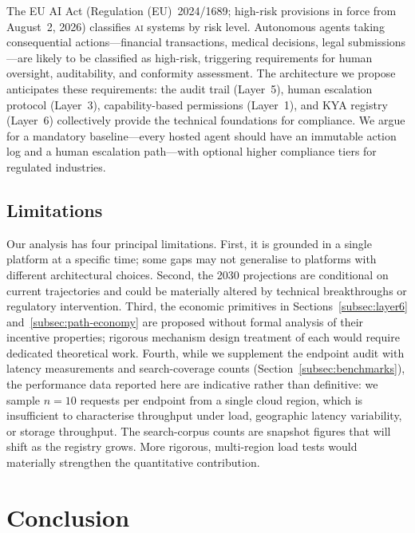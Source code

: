 \documentclass[twoside,11pt]{article}
\begin{document}
The EU AI Act (Regulation (EU)~2024/1689; high-risk provisions in force from
August~2, 2026) classifies
\textsc{ai} systems by risk level.  Autonomous agents taking consequential
actions---financial transactions, medical decisions, legal submissions---are
likely to be classified as high-risk, triggering requirements for human
oversight, auditability, and conformity assessment.  The architecture we
propose anticipates these requirements: the audit trail (Layer~5), human
escalation protocol (Layer~3), capability-based permissions (Layer~1), and
KYA registry (Layer~6) collectively provide the technical foundations for
compliance.  We argue for a mandatory baseline---every hosted agent should have
an immutable action log and a human escalation path---with optional higher
compliance tiers for regulated industries.

\subsection{Limitations}
\label{subsec:limitations}

Our analysis has four principal limitations.  First, it is grounded in a
single platform at a specific time; some gaps may not generalise to platforms
with different architectural choices.  Second, the 2030 projections are
conditional on current trajectories and could be materially altered by
technical breakthroughs or regulatory intervention.  Third, the economic
primitives in Sections~\ref{subsec:layer6} and~\ref{subsec:path-economy} are
proposed without formal analysis of their incentive properties; rigorous
mechanism design treatment of each would require dedicated theoretical work.
Fourth, while we supplement the endpoint audit with latency measurements
and search-coverage counts (Section~\ref{subsec:benchmarks}), the
performance data reported here are indicative rather than definitive:
we sample $n{=}10$ requests per endpoint from a single cloud region, which
is insufficient to characterise throughput under load, geographic latency
variability, or storage throughput.  The search-corpus counts are snapshot
figures that will shift as the registry grows.  More rigorous, multi-region
load tests would materially strengthen the quantitative contribution.

\section{Conclusion}
\label{sec:conclusion}
\end{document}
